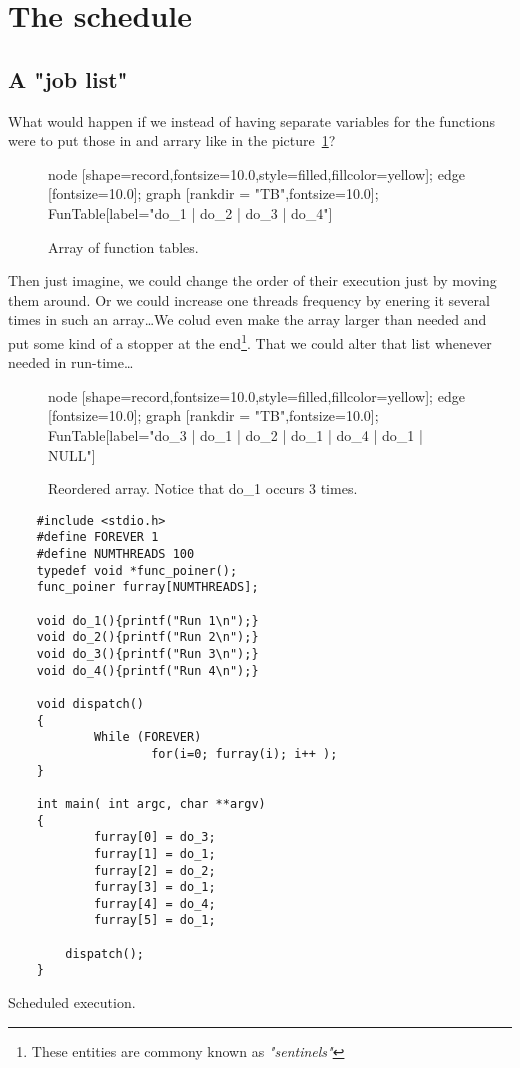 \section{The schedule}
\subsection{A "job list"}
	What would happen if we instead of having separate variables for the functions were to put those in and arrary like in the picture~\ref{FunTable}?
	\begin{figure}[!hbp]
	\begin{dotpic}
		node [shape=record,fontsize=10.0,style=filled,fillcolor=yellow];
		edge [fontsize=10.0];
		graph [rankdir = "TB",fontsize=10.0];
		FunTable[label="do_1 | do_2 | do_3 | do_4"]

	\end{dotpic}
	\caption{Array of function tables.\label{FunTable}}	
	\end{figure}
	Then just imagine, we could change the order of their execution just by moving them around. Or we could increase one threads frequency by enering it several times in such an array\ldots We colud even make the array larger than needed and put some kind of a stopper at the end\footnote{These entities are commony known as \textit{"sentinels"}}. That we could alter that list whenever needed in run-time\ldots
	\begin{figure}[!hbp]
	\begin{dotpic}
		node [shape=record,fontsize=10.0,style=filled,fillcolor=yellow];
		edge [fontsize=10.0];
		graph [rankdir = "TB",fontsize=10.0];
		FunTable[label="do_3 | do_1 | do_2 | do_1 | do_4 | do_1 | \<NULL\>"]
	\end{dotpic}
	\caption{Reordered array. Notice that do\_1 occurs 3 times.\label{FunTable2}}	
	\end{figure}

	\begin{table}[!hbp]
	\begin{verbatim}
	#include <stdio.h>
	#define FOREVER 1
	#define NUMTHREADS 100
	typedef void *func_poiner();
	func_poiner furray[NUMTHREADS];

	void do_1(){printf("Run 1\n");}
	void do_2(){printf("Run 2\n");}
	void do_3(){printf("Run 3\n");}
	void do_4(){printf("Run 4\n");}

	void dispatch()
	{
	        While (FOREVER)
	                for(i=0; furray(i); i++ );
	}

	int main( int argc, char **argv)
	{
	        furray[0] = do_3;
	        furray[1] = do_1;
	        furray[2] = do_2;
	        furray[3] = do_1;
	        furray[4] = do_4;
	        furray[5] = do_1;

		dispatch();
	}
	\end{verbatim}
	\caption{Scheduled execution.\label{schedued1}}
	\end{table}
	
